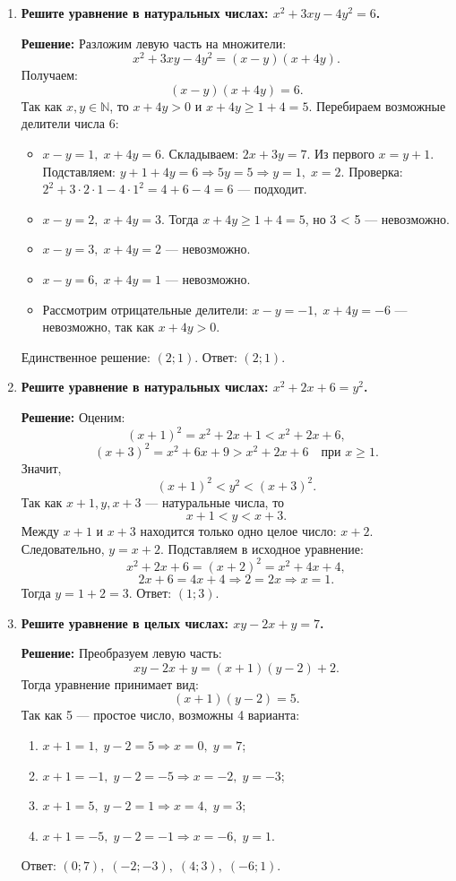 \documentclass[12pt, a4paper]{article}
\begin{document}
\begin{enumerate}[label=\arabic*., wide=0pt, leftmargin=*]
\item \textbf{Решите уравнение в натуральных числах: \(x^2 + 3xy - 4y^2 = 6\).}

\textbf{Решение:}
Разложим левую часть на множители:
\[
x^2 + 3xy - 4y^2 = (x - y)(x + 4y).
\]
Получаем:
\[
(x - y)(x + 4y) = 6.
\]
Так как \(x, y \in \mathbb{N}\), то \(x+4y > 0\) и \(x+4y \ge 1+4=5\). Перебираем возможные делители числа 6:
\begin{itemize}
\item \(x - y = 1,\; x + 4y = 6\). Складываем: \(2x + 3y = 7\). Из первого \(x = y+1\). Подставляем: \(y+1 + 4y = 6 \Rightarrow 5y = 5 \Rightarrow y = 1,\; x = 2\). Проверка: \(2^2 + 3\cdot2\cdot1 - 4\cdot1^2 = 4 + 6 - 4 = 6\) — подходит.
\item \(x - y = 2,\; x + 4y = 3\). Тогда \(x+4y \ge 1+4=5\), но 3 < 5 — невозможно.
\item \(x - y = 3,\; x + 4y = 2\) — невозможно.
\item \(x - y = 6,\; x + 4y = 1\) — невозможно.
\item Рассмотрим отрицательные делители: \(x - y = -1,\; x + 4y = -6\) — невозможно, так как \(x+4y > 0\).
\end{itemize}
Единственное решение: \((2;1)\).
Ответ: \((2;1)\).

\item \textbf{Решите уравнение в натуральных числах: \(x^2 + 2x + 6 = y^2\).}

\textbf{Решение:}
Оценим:
\[
(x+1)^2 = x^2 + 2x + 1 < x^2 + 2x + 6,
\]
\[
(x+3)^2 = x^2 + 6x + 9 > x^2 + 2x + 6 \quad \text{при } x \ge 1.
\]
Значит,
\[
(x+1)^2 < y^2 < (x+3)^2.
\]
Так как \(x+1, y, x+3\) — натуральные числа, то
\[
x+1 < y < x+3.
\]
Между \(x+1\) и \(x+3\) находится только одно целое число: \(x+2\). Следовательно, \(y = x+2\).
Подставляем в исходное уравнение:
\[
x^2 + 2x + 6 = (x+2)^2 = x^2 + 4x + 4,
\]
\[
2x + 6 = 4x + 4 \Rightarrow 2 = 2x \Rightarrow x = 1.
\]
Тогда \(y = 1 + 2 = 3\).
Ответ: \((1;3)\).

\item \textbf{Решите уравнение в целых числах: \(xy - 2x + y = 7\).}

\textbf{Решение:}
Преобразуем левую часть:
\[
xy - 2x + y = (x+1)(y-2) + 2.
\]
Тогда уравнение принимает вид:
\[
(x+1)(y-2) = 5.
\]
Так как 5 — простое число, возможны 4 варианта:
\begin{enumerate}[label=\arabic*)]
\item \(x+1 = 1,\; y-2 = 5 \Rightarrow x = 0,\; y = 7\);
\item \(x+1 = -1,\; y-2 = -5 \Rightarrow x = -2,\; y = -3\);
\item \(x+1 = 5,\; y-2 = 1 \Rightarrow x = 4,\; y = 3\);
\item \(x+1 = -5,\; y-2 = -1 \Rightarrow x = -6,\; y = 1\).
\end{enumerate}
Ответ: \((0;7),\; (-2;-3),\; (4;3),\; (-6;1)\).


\end{enumerate}
\end{document}
